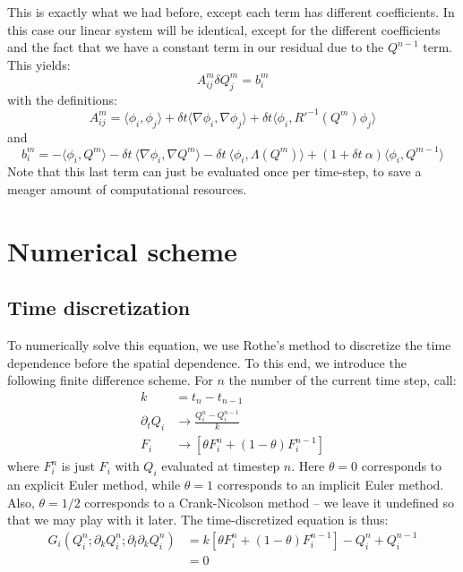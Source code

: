 \documentclass[reqno]{article}
\begin{document}
  This is exactly what we had before, except each term has different
  coefficients.
  In this case our linear system will be identical, except for the different
  coefficients and the fact that we have a constant term in our residual due to
  the $Q^{n - 1}$ term.
  This yields:
  \begin{equation}
    A^m_{ij} \delta Q^m_j = b^m_i
  \end{equation}
  with the definitions:
  \begin{equation}
    A^m_{ij}
    = \langle \phi_i, \phi_j \rangle
    + \delta t \langle \nabla \phi_i, \nabla \phi_j \rangle
    + \delta t \langle \phi_i, R'^{-1}(Q^m) \phi_j \rangle
  \end{equation}
  and
  \begin{equation}
    b^m_i
    = -\langle \phi_i, Q^m \rangle
    - \delta t \: \langle \nabla \phi_i, \nabla Q^m \rangle
    - \delta t \: \langle \phi_i, \Lambda(Q^m) \rangle
    + (1 + \delta t \: \alpha) \langle \phi_i, Q^{m - 1} \rangle
  \end{equation}
  Note that this last term can just be evaluated once per time-step, to save a
  meager amount of computational resources.
	
	\section{Numerical scheme}
	\subsection{Time discretization}
	To numerically solve this equation, we use Rothe's method to discretize the time dependence before the spatial dependence.
	To this end, we introduce the following finite difference scheme.
	For $n$ the number of the current time step, call:
	\begin{align}
		k &= t_n - t_{n - 1} \\
		\partial_t Q_i &\to \frac{Q^n_i - Q^{n - 1}_i}{k} \\
		F_i &\to \left[ \theta F_i^n + (1 - \theta) F_i^{n - 1} \right]
	\end{align}
	where $F^n_i$ is just $F_i$ with $Q_i$ evaluated at timestep $n$.
	Here $\theta = 0$ corresponds to an explicit Euler method, while $\theta = 1$ corresponds to an implicit Euler method.
	Also, $\theta = 1/2$ corresponds to a Crank-Nicolson method -- we leave it undefined so that we may play with it later.
	The time-discretized equation is thus:
	\begin{equation}
	\begin{split}
		G_i \left(Q^n_i ; \partial_k Q^n_i ; \partial_l \partial_k Q^n_i\right)
		&= k \left[ \theta F^n_i + (1 - \theta) F^{n - 1}_i \right]
		- Q^n_i + Q^{n - 1}_i \\
		&= 0
	\end{split}
	\end{equation}
	
\end{document}
